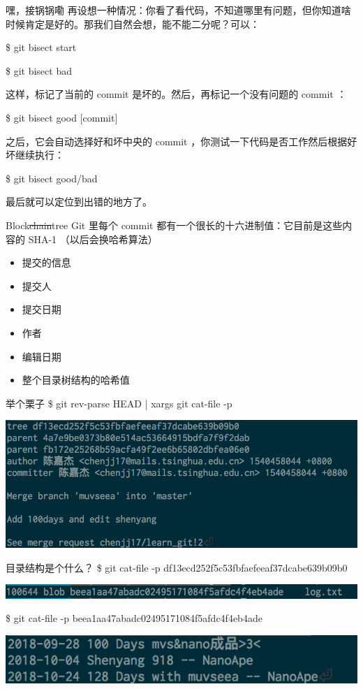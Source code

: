 \documentclass{beamer}
\begin{document}
\begin{frame}{嘿，接锅锅嘞}
    再设想一种情况：你看了看代码，不知道哪里有问题，但你知道啥时候肯定是好的。那我们自然会想，能不能二分呢？可以：

    \$ git bisect start

    \$ git bisect bad

    这样，标记了当前的 commit 是坏的。然后，再标记一个没有问题的 commit ：

    \$ git bisect good [commit]

    之后，它会自动选择好和坏中央的 commit ，你测试一下代码是否工作然后根据好坏继续执行：

    \$ git bisect good/bad

    最后就可以定位到出错的地方了。
\end{frame}

\begin{frame}{Block\st{chain}tree}
    Git 里每个 commit 都有一个很长的十六进制值：它目前是这些内容的 SHA-1 （以后会换哈希算法）

    \begin{itemize}
        \item 提交的信息
        \item 提交人
        \item 提交日期
        \item 作者
        \item 编辑日期
        \item 整个目录树结构的哈希值
    \end{itemize}
\end{frame}

\begin{frame}{举个栗子}
    \$ git rev-parse HEAD | xargs git cat-file -p

    \includegraphics[width=\linewidth]{2018-10-26-21-50-58.png}
\end{frame}

\begin{frame}{目录结构是个什么？}
    \$ git cat-file -p df13ecd252f5c53fbfaefeeaf37dcabe639b09b0 

    \includegraphics[width=\linewidth]{2018-10-26-21-54-08.png}

    \$ git cat-file -p beea1aa47abadc02495171084f5afdc4f4eb4ade

    \includegraphics[width=\linewidth]{2018-10-26-21-55-01.png}
\end{frame}
\end{document}
